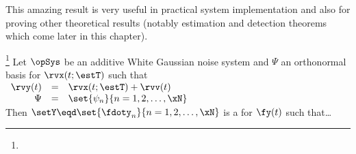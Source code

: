 This amazing result is very useful in practical system implementation
and also for proving other theoretical results
(notably estimation and detection theorems which come later
in this chapter).


\begin{theorem}
\footnote{
  }
\label{thm:sstat}
 
  
Let $\opSys$ be an additive White Gaussian noise system and
$\Psi$ an orthonormal basis for $\rvx(t;\estT)$ such that
\\\indentx$\begin{array}{rcl}
     \rvy(t)&=&    \rvx(t;\estT) + \rvv(t)
   \\\Psi  &=&    \set{\psi_n}{n=1,2,\ldots,\xN}
\end{array}$
\\
Then $\setY\eqd\set{\fdoty_n}{n=1,2,\ldots,\xN}$ is a  for $\fy(t)$ 
such that\ldots
{}
\end{theorem}
